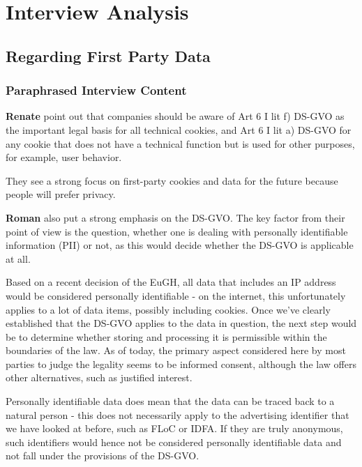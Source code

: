 %
%

\pagebreak
\section{Interview Analysis}

\onehalfspacing

\subsection{Regarding First Party Data}

\subsubsection{Paraphrased Interview Content}

\textbf{Renate} point out that companies should be aware of Art 6 I lit f) DS-GVO as the important legal basis for all technical cookies, and Art 6 I lit a) DS-GVO for any cookie that does not have a technical function but is used for other purposes, for example, user behavior.

They see a strong focus on first-party cookies and data for the future because people will prefer privacy.

\textbf{Roman} also put a strong emphasis on the DS-GVO. The key factor from their point of view is the question, whether one is dealing with personally identifiable information (PII) or not, as this would decide whether the DS-GVO is applicable at all. 

Based on a recent decision of the EuGH, all data that includes an IP address would be considered personally identifiable - on the internet, this unfortunately applies to a lot of data items, possibly including cookies. Once we've clearly established that the DS-GVO applies to the data in question, the next step would be to determine whether storing and processing it is permissible within the boundaries of the law. As of today, the primary aspect considered here by most parties to judge the legality seems to be informed consent, although the law offers other alternatives, such as justified interest.

Personally identifiable data does mean that the data can be traced back to a natural person - this does not necessarily apply to the advertising identifier that we have looked at before, such as FLoC or IDFA. If they are truly anonymous, such identifiers would hence not be considered personally identifiable data and not fall under the provisions of the DS-GVO.

